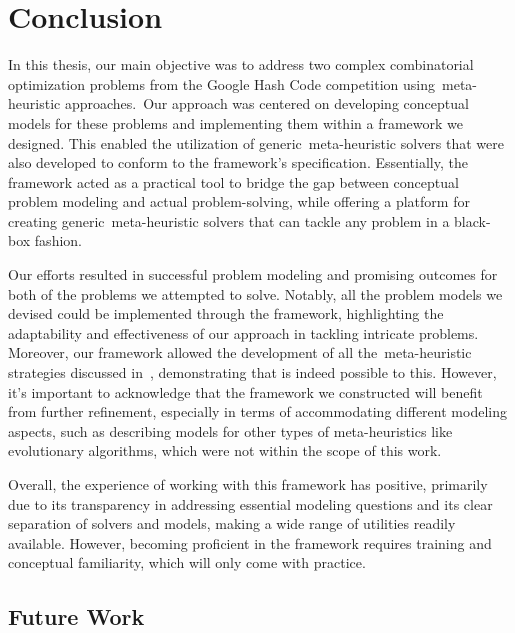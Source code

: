 \chapter{Conclusion}
\label{ch:conclusion}


In this thesis, our main objective was to address two complex combinatorial
optimization problems from the Google Hash Code competition using~\acrshort{meta-heuristic}
approaches.~Our approach was centered on developing conceptual models for these
problems and implementing them within a framework we designed. This enabled the
utilization of generic~\acrshort{meta-heuristic} solvers that were also developed to
conform to the framework's specification. Essentially, the framework acted as a
practical tool to bridge the gap between conceptual problem modeling and actual
problem-solving, while offering a platform for creating generic~\acrshort{meta-heuristic}
solvers that can tackle any problem in a black-box fashion.

Our efforts resulted in successful problem modeling and promising outcomes for
both of the problems we attempted to solve. Notably, all the problem models we
devised could be implemented through the framework, highlighting the
adaptability and effectiveness of our approach in tackling intricate problems.
Moreover, our framework allowed the development of all the~\acrshort{meta-heuristic}
strategies discussed in~, demonstrating that is indeed
possible to this. However, it's important to acknowledge that the framework we
constructed will benefit from further refinement, especially in terms of
accommodating different modeling aspects, such as describing models for other
types of meta-heuristics like evolutionary algorithms, which were not within the
scope of this work.

Overall, the experience of working with this framework has positive, primarily
due to its transparency in addressing essential modeling questions and its clear
separation of solvers and models, making a wide range of utilities readily
available. However, becoming proficient in the framework requires
training and conceptual familiarity, which will only come with practice.

\section{Future Work}

